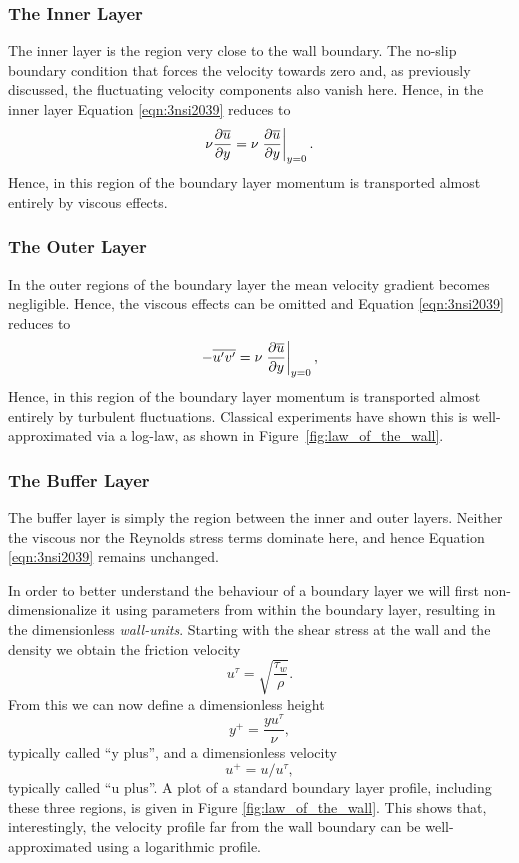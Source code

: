 \subsubsection{The Inner Layer}
The inner layer is the region very close to the wall boundary. The no-slip boundary condition that forces the velocity towards zero and, as previously discussed, the fluctuating velocity components also vanish here. Hence, in the inner layer Equation \ref{eqn:3nsi2039} reduces to
\begin{equation}
	\label{eqn:3nsi2039}
	\nu \frac{\partial \overline{u}}{\partial y} = \nu \left.\frac{\partial \overline{u}}{\partial y}\right\rvert_{y=0}^{}.
\end{equation}
Hence, in this region of the boundary layer momentum is transported almost entirely by viscous effects.
\subsubsection{The Outer Layer}
In the outer regions of the boundary layer the mean velocity gradient becomes negligible. Hence, the viscous effects can be omitted and Equation \ref{eqn:3nsi2039} reduces to
\begin{equation}
	\label{eqn:3nsi2039}
	 - \overline{u^\prime v^\prime} = \nu \left.\frac{\partial \overline{u}}{\partial y}\right\rvert_{y=0}^{},
\end{equation}
Hence, in this region of the boundary layer momentum is transported almost entirely by turbulent fluctuations. Classical experiments have shown this is well-approximated via a log-law, as shown in Figure~\ref{fig:law_of_the_wall}.
\subsubsection{The Buffer Layer}
The buffer layer is simply the region between the inner and outer layers. Neither the viscous nor the Reynolds stress terms dominate here, and hence Equation \ref{eqn:3nsi2039} remains unchanged.

In order to better understand the behaviour of a boundary layer we will first non-dimensionalize it using parameters from within the boundary layer, resulting in the dimensionless {\it wall-units}. Starting with the shear stress at the wall and the density we obtain the friction velocity
\begin{equation}
	u^{\tau} = \sqrt{\frac{\tau_w}{\rho}}.
\end{equation}
From this we can now define a dimensionless height
\begin{equation}
	y^+ = \frac{y u^{\tau}}{\nu},
\end{equation} 
typically called ``y plus'', and a dimensionless velocity
\begin{equation}
	u^+ = u/u^{\tau},
\end{equation} 
typically called ``u plus''. A plot of a standard boundary layer profile, including these three regions, is given in Figure \ref{fig:law_of_the_wall}. This shows that, interestingly, the velocity profile far from the wall boundary can be well-approximated using a logarithmic profile.
